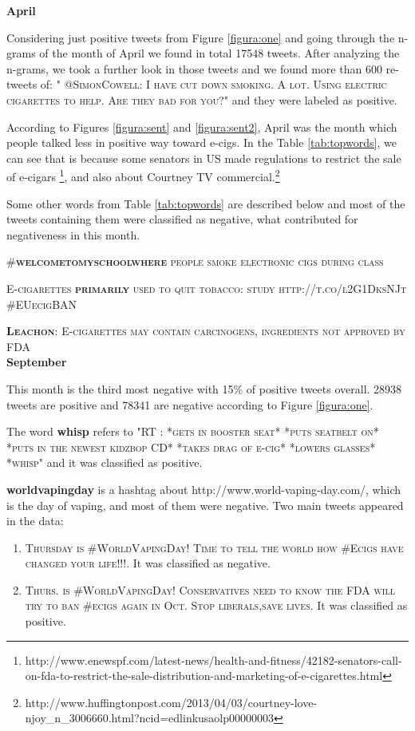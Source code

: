 \documentclass{sig-alternate}
\begin{document}
\textbf{April}

 
Considering just positive tweets from Figure \ref{figura:one} and going through the n-grams of the month of April we found in total 17548 tweets. After analyzing the n-grams, we took a further look in those tweets and we found more than 600 re-tweets of: \textsc{" @SimonCowell: I have cut down smoking. A lot. Using electric cigarettes to help. Are they bad for you?"} and they were labeled as positive.

According to Figures \ref{figura:sent} and \ref{figura:sent2}, April was the month which people talked less in positive way toward e-cigs. In the Table \ref{tab:topwords}, we can see that is because some senators in US made regulations to restrict the sale of e-cigars \footnote{http://www.enewspf.com/latest-news/health-and-fitness/42182-senators-call-on-fda-to-restrict-the-sale-distribution-and-marketing-of-e-cigarettes.html}, and also about Courtney TV commercial.\footnote{http://www.huffingtonpost.com/2013/04/03/courtney-love-njoy\_n\_3006660.html?ncid=edlinkusaolp00000003}

Some other words from Table \ref{tab:topwords} are described below and most of the tweets containing them were classified as negative, what contributed for negativeness in this month.

\textsc{\#\textbf{welcometomyschoolwhere} people smoke electronic cigs during class}

\textsc{E-cigarettes \textbf{primarily} used to quit tobacco: study http://t.co/l2G1DksNJt \#EUecigBAN}

\textsc{\textbf{Leachon}: E-cigarettes may contain carcinogens, ingredients not approved by FDA}\\


\textbf{September}

This month is the third most negative with 15\%  of positive tweets overall. 28938 tweets are positive and 78341 are negative according to Figure \ref{figura:one}.

The word \textbf{whisp} refers to \textsc{"RT \@YABOYLILB: *gets in booster seat*  *puts seatbelt on*  *puts in the newest kidzbop CD*  *takes drag of e-cig*  *lowers glasses*  *whisp"} and it was classified as positive.

\textbf{worldvapingday} is a hashtag about http://www.world-vaping-day.com/, which is the day of vaping, and most of them were negative. Two main tweets appeared in the data: 
\begin{enumerate}

\item \textsc{Thursday is \#WorldVapingDay!  Time to tell the world how \#Ecigs have changed your life!!!}. It was classified as negative.
\item \textsc{Thurs. is \#WorldVapingDay! Conservatives need to know the FDA will try to ban \#ecigs again in Oct. Stop liberals,save lives}. It was classified as positive.
\end{enumerate}
\end{document}
